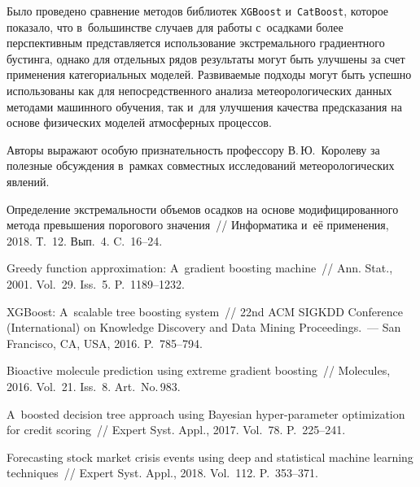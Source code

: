 \begin{multicols}{2}
Было проведено сравнение методов библиотек \verb"XGBoost" и~\verb"CatBoost", 
которое показало, что в~большинстве случаев для работы с~осадками более 
перспективным представляется использование экс\-тремального градиентного бустинга, однако для отдельных рядов результаты могут быть улучшены за счет применения категориальных моделей. Развиваемые подходы могут быть успешно использованы как для непосредственного анализа метеорологических данных методами машинного обучения, так и~для улучшения качества предсказания на основе физических моделей атмосферных процессов.

\bigskip
Авторы выражают особую признательность профессору В.\,Ю.~Королеву 
за полезные обсуждения в~рамках совместных исследований 
метеорологических явлений.


\vspace*{-6pt}

{\small\frenchspacing
 {%
 \begin{thebibliography}{99}
 
\vspace*{-3pt}
 
Определение экстремальности объемов осадков на основе модифицированного 
метода превышения порогового значения~// Информатика и~её применения, 2018. Т.~12. 
Вып.~4. C.~16--24.

Greedy function approximation: A~gradient boosting machine~// Ann. Stat., 
2001. Vol.~29. Iss.~5. P.~1189--1232.

 XGBoost: A~scalable tree boosting system~// 
22nd ACM SIGKDD  Conference (International) on Knowledge Discovery and Data Mining
Proceedings.~--- San Francisco, CA, USA, 2016. P.~785--794.

Bioactive molecule prediction using extreme gradient boosting~// 
Molecules, 2016. Vol.~21. Iss.~8. Art.~No.\,983.

A~boosted decision tree approach using Bayesian hyper-parameter optimization 
for credit scoring~// Expert Syst. Appl., 2017. Vol.~78. P.~225--241.

 Forecasting stock market crisis events using deep and statistical machine 
 learning techniques~// Expert Syst. Appl., 2018. Vol.~112. P.~353--371.


\end{thebibliography}}}
\end{multicols}
